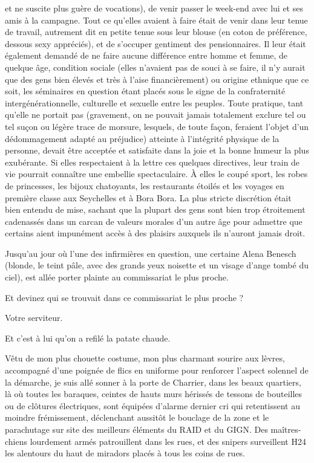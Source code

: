et ne suscite plus guère de vocations), de venir passer le week-end avec lui et ses amis à la campagne. Tout ce qu’elles avaient à faire était de venir dans leur tenue de travail, autrement dit en petite tenue sous leur blouse (en coton de préférence, dessous sexy appréciés), et de s’occuper gentiment des pensionnaires. Il leur était également demandé de ne faire aucune différence entre homme et femme, de quelque âge, condition sociale (elles n’avaient pas de souci à se faire, il n’y aurait que des gens bien élevés et très à l’aise financièrement) ou origine ethnique que ce soit, les séminaires en question étant placés sous le signe de la confraternité intergénérationnelle, culturelle et sexuelle entre les peuples. Toute pratique, tant qu’elle ne portait pas (gravement, on ne pouvait jamais totalement exclure tel ou tel suçon ou légère trace de morsure, lesquels, de toute façon, feraient l’objet d’un dédommagement adapté au préjudice) atteinte à l’intégrité physique de la personne, devait être acceptée et satisfaite dans la joie et la bonne humeur la plus exubérante. Si elles respectaient à la lettre ces quelques directives, leur train de vie pourrait connaître une embellie spectaculaire. À elles le coupé sport, les robes de princesses, les bijoux chatoyants, les restaurants étoilés et les voyages en première classe aux Seychelles et à Bora Bora. La plus stricte discrétion était bien entendu de mise, sachant que la plupart des gens sont bien trop étroitement cadenassés dans un carcan de valeurs morales d’un autre âge pour admettre que certains aient impunément accès à des plaisirs auxquels ils n’auront jamais droit.

Jusqu’au jour où l’une des infirmières en question, une certaine Alena Benesch (blonde, le teint pâle, avec des grands yeux noisette et un visage d’ange tombé du ciel), est allée porter plainte au commissariat le plus proche.

Et devinez qui se trouvait dans ce commissariat le plus proche ?

Votre serviteur.

Et c’est à lui qu’on a refilé la patate chaude.

Vêtu de mon plus chouette costume, mon plus charmant sourire aux lèvres, accompagné d’une poignée de flics en uniforme pour renforcer l’aspect solennel de la démarche, je suis allé sonner à la porte de Charrier, dans les beaux quartiers, là où toutes les baraques, ceintes de hauts murs hérissés de tessons de bouteilles ou de clôtures électriques, sont équipées d’alarme dernier cri qui retentissent au moindre frémissement, déclenchant aussitôt le bouclage de la zone et le parachutage sur site des meilleurs éléments du RAID et du GIGN. Des maîtres-chiens lourdement armés patrouillent dans les rues, et des snipers surveillent H24 les alentours du haut de miradors placés à tous les coins de rues.

